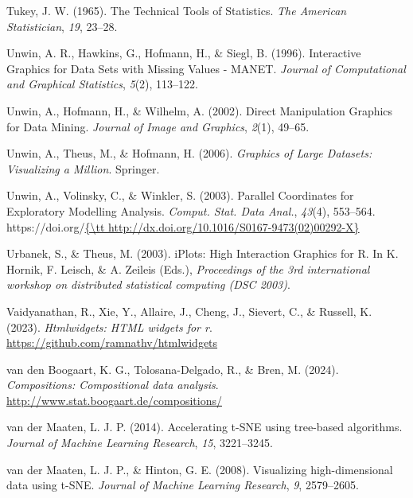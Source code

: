 \documentclass[
  letterpaper,
]{krantz}
\newlength{\cslhangindent}
\newenvironment{CSLReferences}[2] %
 {\begin{list}{}{%
  \setlength{\itemindent}{0pt}
  \setlength{\leftmargin}{0pt}
  \setlength{\parsep}{0pt}
  \ifodd #1
   \setlength{\leftmargin}{\cslhangindent}
   \setlength{\itemindent}{-1\cslhangindent}
  \fi
  \setlength{\itemsep}{#2\baselineskip}}}
 {\end{list}}
\begin{document}
\begin{CSLReferences}{1}{0}
Tukey, J. W. (1965). The {T}echnical {T}ools of {S}tatistics. \emph{The
American Statistician}, \emph{19}, 23--28.

Unwin, A. R., Hawkins, G., Hofmann, H., \& Siegl, B. (1996).
{I}nteractive {G}raphics for {D}ata {S}ets with {M}issing {V}alues -
{MANET}. \emph{Journal of Computational and Graphical Statistics},
\emph{5}(2), 113--122.

Unwin, A., Hofmann, H., \& Wilhelm, A. (2002). Direct {M}anipulation
{G}raphics for {D}ata {M}ining. \emph{Journal of Image and Graphics},
\emph{2}(1), 49--65.

Unwin, A., Theus, M., \& Hofmann, H. (2006). \emph{Graphics of {L}arge
{D}atasets: {V}isualizing a {M}illion}. Springer.

Unwin, A., Volinsky, C., \& Winkler, S. (2003). Parallel {C}oordinates
for {E}xploratory {M}odelling {A}nalysis. \emph{Comput. Stat. Data
Anal.}, \emph{43}(4), 553--564.
https://doi.org/\href{\%7B/tt\%20http://dx.doi.org/10.1016/S0167-9473(02)00292-X\%7D}{\{\textbackslash tt
http://dx.doi.org/10.1016/S0167-9473(02)00292-X\}}

Urbanek, S., \& Theus, M. (2003). {iPlots}: {H}igh {I}nteraction
{G}raphics for {R}. In K. Hornik, F. Leisch, \& A. Zeileis (Eds.),
\emph{Proceedings of the 3rd international workshop on distributed
statistical computing (DSC 2003)}.

Vaidyanathan, R., Xie, Y., Allaire, J., Cheng, J., Sievert, C., \&
Russell, K. (2023). \emph{Htmlwidgets: HTML widgets for r}.
\url{https://github.com/ramnathv/htmlwidgets}

van den Boogaart, K. G., Tolosana-Delgado, R., \& Bren, M. (2024).
\emph{Compositions: Compositional data analysis}.
\url{http://www.stat.boogaart.de/compositions/}

van der Maaten, L. J. P. (2014). Accelerating t-SNE using tree-based
algorithms. \emph{Journal of Machine Learning Research}, \emph{15},
3221--3245.

van der Maaten, L. J. P., \& Hinton, G. E. (2008). Visualizing
high-dimensional data using t-SNE. \emph{Journal of Machine Learning
Research}, \emph{9}, 2579--2605.


\end{CSLReferences}
\end{document}
